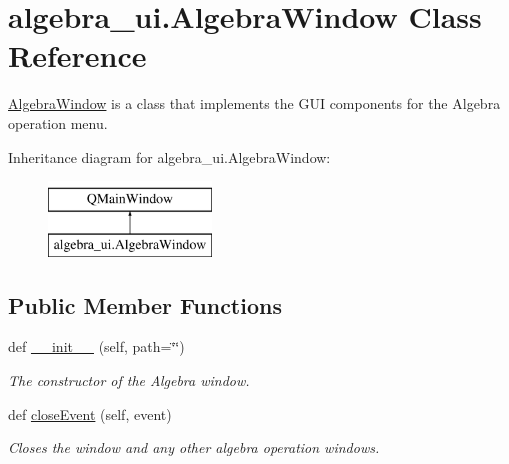 \hypertarget{classalgebra__ui_1_1_algebra_window}{}\section{algebra\+\_\+ui.\+Algebra\+Window Class Reference}
\label{classalgebra__ui_1_1_algebra_window}


\hyperlink{classalgebra__ui_1_1_algebra_window}{Algebra\+Window} is a class that implements the G\+UI components for the Algebra operation menu.  


Inheritance diagram for algebra\+\_\+ui.\+Algebra\+Window\+:\begin{figure}[H]
\begin{center}
\leavevmode
\includegraphics[height=2.000000cm]{classalgebra__ui_1_1_algebra_window}
\end{center}
\end{figure}
\subsection*{Public Member Functions}
\begin{DoxyCompactItemize}
\item 
def \hyperlink{classalgebra__ui_1_1_algebra_window_a8a5c82431399cd2792b44fdcff991873}{\+\_\+\+\_\+init\+\_\+\+\_\+} (self, path=\char`\"{}\char`\"{})
\begin{DoxyCompactList}\small\item\em The constructor of the Algebra window. \end{DoxyCompactList}\item 
\mbox{\label{classalgebra__ui_1_1_algebra_window_a9cea9145ffa4ded4917c4f7f18654b5c}} 
def \hyperlink{classalgebra__ui_1_1_algebra_window_a9cea9145ffa4ded4917c4f7f18654b5c}{close\+Event} (self, event)
\begin{DoxyCompactList}\small\item\em Closes the window and any other algebra operation windows. \end{DoxyCompactList}\end{DoxyCompactItemize}
